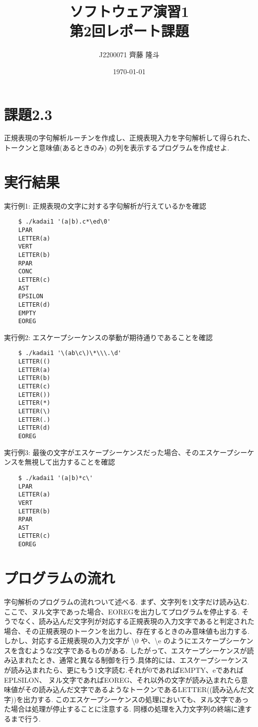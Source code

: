 \documentclass{jsarticle}
\title{ソフトウェア演習1 \\
第2回レポート課題}
\author{J2200071 齊藤 隆斗}
\date{\today}
\theoremstyle{plain}
\begin{document}
\maketitle


\section{課題2.3}
正規表現の字句解析ルーチンを作成し、正規表現入力を字句解析して得られた、トークンと意味値(あるときのみ)
の列を表示するプログラムを作成せよ.





\section{実行結果}

実行例1: 正規表現の文字に対する字句解析が行えているかを確認
\begin{lstlisting}
	$ ./kadai1 '(a|b).c*\ed\0'
	LPAR
	LETTER(a)
	VERT
	LETTER(b)
	RPAR
	CONC
	LETTER(c)
	AST
	EPSILON
	LETTER(d)
	EMPTY
	EOREG
\end{lstlisting}

実行例2: エスケープシーケンスの挙動が期待通りであることを確認
\begin{lstlisting}
	$ ./kadai1 '\(ab\c\)\*\\\.\d'
	LETTER(()
	LETTER(a)
	LETTER(b)
	LETTER(c)
	LETTER())
	LETTER(*)
	LETTER(\)
	LETTER(.)
	LETTER(d)
	EOREG
\end{lstlisting}

実行例3: 最後の文字がエスケープシーケンスだった場合、そのエスケープシーケンスを無視して出力することを確認
\begin{lstlisting}
	$ ./kadai1 '(a|b)*c\'
	LPAR
	LETTER(a)
	VERT
	LETTER(b)
	RPAR
	AST
	LETTER(c)
	EOREG
\end{lstlisting}



\section{プログラムの流れ}
字句解析のプログラムの流れついて述べる. まず、文字列を1文字だけ読み込む.ここで、ヌル文字であった場合、EOREGを出力してプログラムを停止する.
そうでなく、読み込んだ文字列が対応する正規表現の入力文字であると判定された場合、その正規表現のトークンを出力し、存在するときのみ意味値も出力する.
しかし、対応する正規表現の入力文字が \textbackslash 0 や、\textbackslash e のようにエスケープシーケンスを含むような2文字であるものがある.
したがって、エスケープシーケンスが読み込まれたとき、通常と異なる制御を行う.具体的には、エスケープシーケンスが読み込まれたら、更にもう1文字読む.それが0であればEMPTY、eであればEPLSILON、
ヌル文字であればEOREG、それ以外の文字が読み込まれたら意味値がその読み込んだ文字であるようなトークンであるLETTER((読み込んだ文字))を出力する.
このエスケープシーケンスの処理においても、ヌル文字であった場合は処理が停止することに注意する.
同様の処理を入力文字列の終端に達するまで行う.
\end{document}

